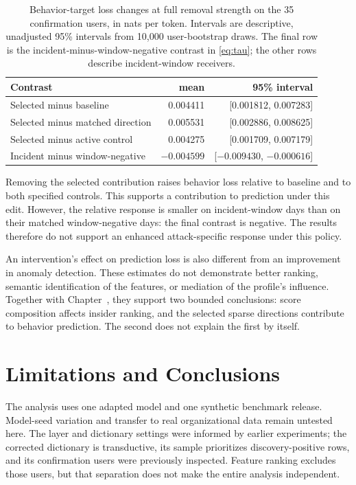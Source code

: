 \documentclass[12pt]{report}
\newcommand{\chref}[1]{Chapter~\uppercase\expandafter{\romannumeral\getrefnumber{#1}}}
\begin{document}
\begin{table}[!htbp]
\centering
\caption[Corrected feature-removal effects]{Behavior-target loss changes at full removal strength on the 35 confirmation
users, in nats per token. Intervals are descriptive, unadjusted 95\% intervals from 10,000
user-bootstrap draws. The final row is the incident-minus-window-negative contrast in
\eqref{eq:tau}; the other rows describe incident-window receivers.}
\label{tab:ablation}
\begin{tabular}{lrr}
\toprule
Contrast & mean & 95\% interval \\
\midrule
Selected minus baseline & 0.004411 & [0.001812, 0.007283] \\
Selected minus matched direction & 0.005531 & [0.002886, 0.008625] \\
Selected minus active control & 0.004275 & [0.001709, 0.007179] \\
Incident minus window-negative & $-0.004599$ & [$-0.009430$, $-0.000616$] \\
\bottomrule
\end{tabular}
\end{table}

Removing the selected contribution raises behavior loss relative to baseline and to both
specified controls. This supports a contribution to prediction under this edit. However,
the relative response is smaller on incident-window days than on their matched
window-negative days: the final contrast is negative. The results therefore do not support
an enhanced attack-specific response under this policy.

An intervention's effect on prediction loss is also different from an improvement in anomaly
detection. These estimates do not demonstrate better ranking, semantic identification of the
features, or mediation of the profile's influence. Together with \chref{ch:lm}, they support
two bounded conclusions: score composition affects insider ranking, and the selected sparse
directions contribute to behavior prediction. The second does not explain the first by itself.

\section{Limitations and Conclusions}
The analysis uses one adapted model and one synthetic benchmark release. Model-seed
variation and transfer to real organizational data remain untested here. The layer and
dictionary settings were informed by earlier experiments; the corrected dictionary is
transductive, its sample prioritizes discovery-positive rows, and its confirmation users were
previously inspected. Feature ranking excludes
those users, but that separation does not make the entire analysis independent.
\end{document}
